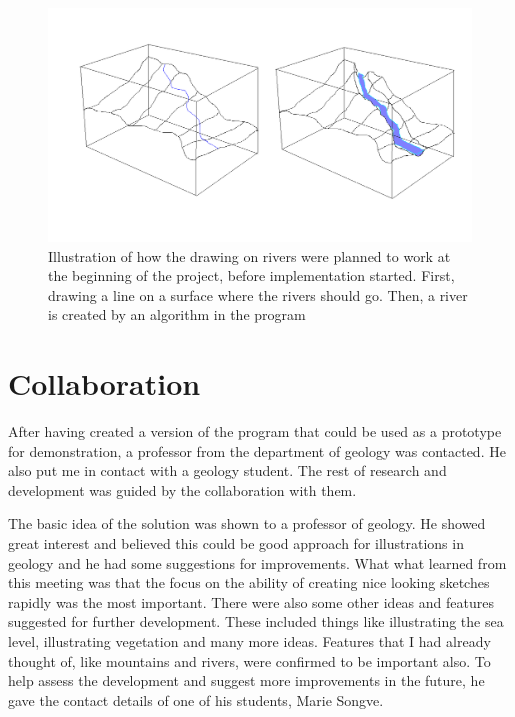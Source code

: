 \documentclass[a4paper,12pt]{report}
\begin{document}
\begin{figure}
 \includegraphics[width=\linewidth]{thesis/river.png}
 \caption{Illustration of how the drawing on rivers were planned to work at the beginning of the project, before implementation started. First, drawing a line on a surface where the rivers should go. Then, a river is created by an algorithm in the program}
 \label{fig:riverDesription}
\end{figure}


\section{Collaboration}
After having created a version of the program that could be used as a prototype for demonstration, a professor from the department of geology was contacted. He also put me in contact with a geology student. The rest of research and development was guided by the collaboration with them. 

The basic idea of the solution was shown to a professor of geology. He showed great interest and believed this could be good approach for illustrations in geology and he had some suggestions for improvements. What what learned from this meeting was that the focus on the ability of creating nice looking sketches rapidly was the most important. There were also some other ideas and features suggested for further development. These included things like illustrating the sea level, illustrating vegetation and many more ideas. Features that I had already thought of, like mountains and rivers, were confirmed to be important also. To help assess the development and suggest more improvements in the future, he gave the contact details of one of his students, Marie Songve.

\end{document}

